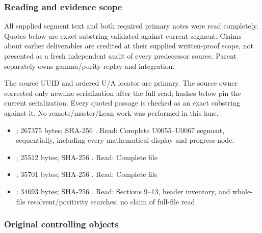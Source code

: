 \subsubsection{Reading and evidence
scope}\label{reading-and-evidence-scope}

All supplied segment text and both required primary notes were read
completely. Quotes below are exact substring-validated against current
segment. Claims about earlier deliverables are credited at their
supplied written-proof scope, not presented as a fresh independent audit
of every predecessor source. Parent separately owns gamma/purity replay
and integration.

The source UUID and ordered U/A locator are primary. The source owner
corrected only newline serialization after the full read; hashes below
pin the current serialization. Every quoted passage is checked as an
exact substring against it. No remote/master/Lean work was performed in
this lane.

\begin{itemize}
\tightlist
\item
  \protect{};
  267375 bytes; SHA-256
  \protect{}.
  Read: Complete U0055--U0067 segment, sequentially, including every
  mathematical display and progress node.
\item
  \protect{};
  25512 bytes; SHA-256
  \protect{}.
  Read: Complete file
\item
  \protect{};
  35701 bytes; SHA-256
  \protect{}.
  Read: Complete file
\item
  \protect{};
  34693 bytes; SHA-256
  \protect{}.
  Read: Sections 9--13, header inventory, and whole-file
  resolvent/positivity searches; no claim of full-file read
\end{itemize}

\subsubsection{Original controlling
objects}\label{original-controlling-objects}

